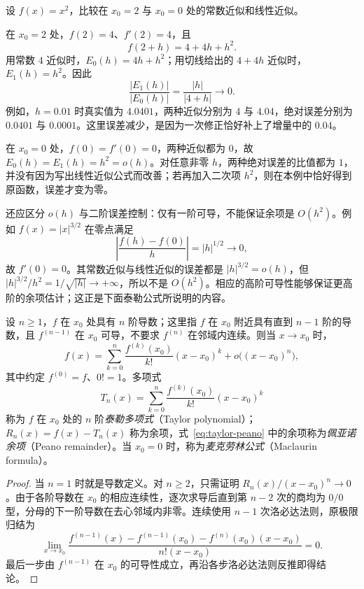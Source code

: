 \begin{example}
\label{ex:peano-quadratic-linear-error-comparison}
设 $f(x)=x^2$，比较在 $x_0=2$ 与 $x_0=0$ 处的常数近似和线性近似。
\end{example}

\begin{solve}
在 $x_0=2$ 处，$f(2)=4$、$f'(2)=4$，且
\[
    f(2+h)=4+4h+h^2.
\]
用常数 $4$ 近似时，$E_0(h)=4h+h^2$；用切线给出的 $4+4h$ 近似时，$E_1(h)=h^2$。因此
\[
    \frac{|E_1(h)|}{|E_0(h)|}
    =\frac{|h|}{|4+h|}\longrightarrow0.
\]
例如，$h=0.01$ 时真实值为 $4.0401$，两种近似分别为 $4$ 与 $4.04$，绝对误差分别为 $0.0401$ 与 $0.0001$。这里误差减少，是因为一次修正恰好补上了增量中的 $0.04$。

在 $x_0=0$ 处，$f(0)=f'(0)=0$，两种近似都为 $0$，故 $E_0(h)=E_1(h)=h^2=o(h)$。对任意非零 $h$，两种绝对误差的比值都为 $1$，并没有因为写出线性近似公式而改善；若再加入二次项 $h^2$，则在本例中恰好得到原函数，误差才变为零。
\end{solve}

还应区分 $o(h)$ 与二阶误差控制：仅有一阶可导，不能保证余项是 $O(h^2)$。例如 $f(x)=|x|^{3/2}$ 在零点满足
\[
    \left|\frac{f(h)-f(0)}h\right|=|h|^{1/2}\to0,
\]
故 $f'(0)=0$。其常数近似与线性近似的误差都是 $|h|^{3/2}=o(h)$，但 $|h|^{3/2}/h^2=1/\sqrt{|h|}\to+\infty$，所以不是 $O(h^2)$。相应的高阶可导性能够保证更高阶的余项估计；这正是下面泰勒公式所说明的内容。

\begin{theorem}[带佩亚诺余项的泰勒公式]
\label{thm:taylor-peano}
设 $n\geq1$，$f$ 在 $x_0$ 处具有 $n$ 阶导数；这里指 $f$ 在 $x_0$ 附近具有直到 $n-1$ 阶的导数，且 $f^{(n-1)}$ 在 $x_0$ 可导，不要求 $f^{(n)}$ 在邻域内连续。则当 $x\to x_0$ 时，
\begin{equation}
    f(x)=\sum_{k=0}^n\frac{f^{(k)}(x_0)}{k!}(x-x_0)^k
         +o\bigl((x-x_0)^n\bigr),
    \label{eq:taylor-peano}
\end{equation}
其中约定 $f^{(0)}=f$、$0!=1$。多项式
\[
    T_n(x)=\sum_{k=0}^n\frac{f^{(k)}(x_0)}{k!}(x-x_0)^k
\]
称为 $f$ 在 $x_0$ 处的 $n$ 阶\emph{泰勒多项式}（Taylor polynomial）；$R_n(x)=f(x)-T_n(x)$ 称为余项，式~\eqref{eq:taylor-peano} 中的余项称为\emph{佩亚诺余项}（Peano remainder）。当 $x_0=0$ 时，称为\emph{麦克劳林公式}（Maclaurin formula）。
\end{theorem}

\begin{proof}
当 $n=1$ 时就是导数定义。对 $n\geq2$，只需证明 $R_n(x)/(x-x_0)^n\to0$。由于各阶导数在 $x_0$ 的相应连续性，逐次求导后直到第 $n-2$ 次的商均为 $0/0$ 型，分母的下一阶导数在去心邻域内非零。连续使用 $n-1$ 次洛必达法则，原极限归结为
\[
    \lim_{x\to x_0}
    \frac{f^{(n-1)}(x)-f^{(n-1)}(x_0)-f^{(n)}(x_0)(x-x_0)}
         {n!(x-x_0)}=0.
\]
最后一步由 $f^{(n-1)}$ 在 $x_0$ 的可导性成立，再沿各步洛必达法则反推即得结论。
\end{proof}

